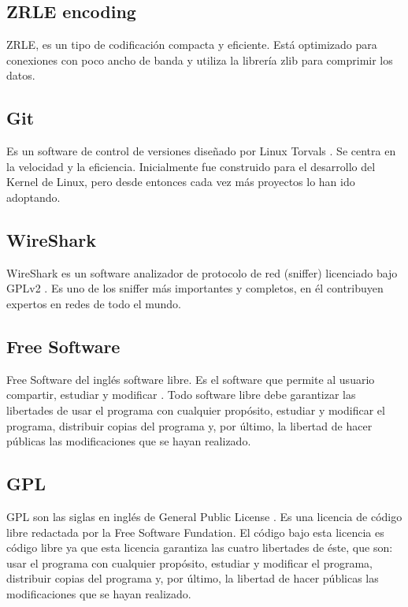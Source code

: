 \subsection{ZRLE encoding}

ZRLE, es un tipo de codificación compacta y eficiente. Está optimizado para conexiones con poco ancho de banda y utiliza la librería zlib para comprimir los datos.

\subsection{Git}

Es un software de control de versiones diseñado por Linux Torvals \cite{wiki:git}\cite{git:git}. Se centra en la velocidad y la eficiencia. Inicialmente fue construido para el desarrollo del Kernel de Linux, pero desde entonces cada vez más proyectos lo han ido adoptando.

\subsection{WireShark}

WireShark es un software analizador de protocolo de red (sniffer) licenciado bajo GPLv2 \cite{wiresharkpage:wireshark}. Es uno de los sniffer más importantes y completos, en él contribuyen expertos en redes de todo el mundo.

\subsection{Free Software}

Free Software del inglés software libre. Es el software que permite al usuario compartir, estudiar y modificar \cite{FSpage:FS}. Todo software libre debe garantizar las libertades de usar el programa con cualquier propósito, estudiar y modificar el programa, distribuir copias del programa y, por último, la libertad de hacer públicas las modificaciones que se hayan realizado.

\subsection{GPL}

GPL son las siglas en inglés de General Public License \cite{GPLpage:GPL}. Es una licencia de código libre redactada por la Free Software Fundation. El código bajo esta licencia es código libre ya que esta licencia garantiza las cuatro libertades de éste, que son: usar el programa con cualquier propósito, estudiar y modificar el programa, distribuir copias del programa y, por último, la libertad de hacer públicas las modificaciones que se hayan realizado.
\newpage
